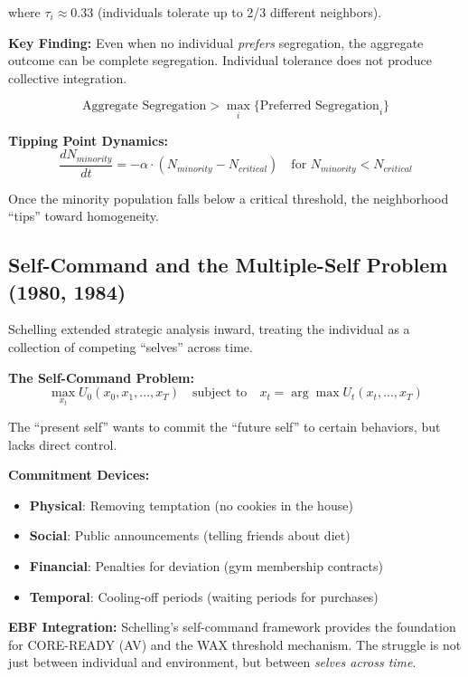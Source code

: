 where $\tau_i \approx 0.33$ (individuals tolerate up to 2/3 different neighbors).

\textbf{Key Finding:} Even when no individual \textit{prefers} segregation, the
aggregate outcome can be complete segregation. Individual tolerance does not
produce collective integration.

\begin{equation}
\text{Aggregate Segregation} > \max_i \{\text{Preferred Segregation}_i\}
\label{eq:ts-emergent}
\end{equation}

\textbf{Tipping Point Dynamics:}
\begin{equation}
\frac{dN_{minority}}{dt} = -\alpha \cdot (N_{minority} - N_{critical}) \quad \text{for } N_{minority} < N_{critical}
\label{eq:ts-tipping}
\end{equation}

Once the minority population falls below a critical threshold, the neighborhood
``tips'' toward homogeneity.

\subsection{Self-Command and the Multiple-Self Problem (1980, 1984)}

Schelling extended strategic analysis inward, treating the individual as a
collection of competing ``selves'' across time.

\textbf{The Self-Command Problem:}
\begin{equation}
\max_{x_t} U_0(x_0, x_1, ..., x_T) \quad \text{subject to} \quad x_t = \arg\max U_t(x_t, ..., x_T)
\end{equation}

The ``present self'' wants to commit the ``future self'' to certain behaviors,
but lacks direct control.

\textbf{Commitment Devices:}
\begin{itemize}
\item \textbf{Physical}: Removing temptation (no cookies in the house)
\item \textbf{Social}: Public announcements (telling friends about diet)
\item \textbf{Financial}: Penalties for deviation (gym membership contracts)
\item \textbf{Temporal}: Cooling-off periods (waiting periods for purchases)
\end{itemize}

\textbf{EBF Integration:} Schelling's self-command framework provides the foundation
for CORE-READY (AV) and the WAX threshold mechanism. The struggle is not just
between individual and environment, but between \textit{selves across time}.

